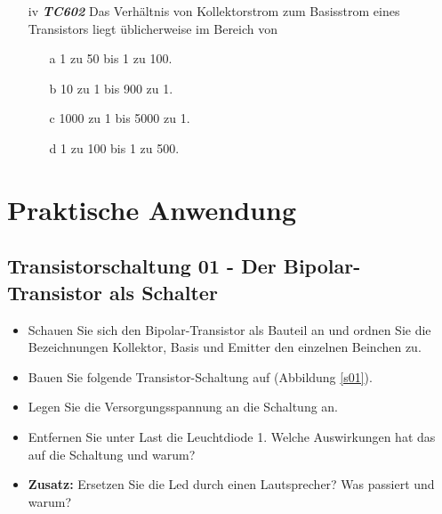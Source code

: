 
\begin{enumerate} 
\item[iv] \emph{\textbf{TC602}}  Das Verhältnis von Kollektorstrom zum Basisstrom eines Transistors liegt üblicherweise im Bereich von
	\begin{enumerate}
	\itemsep1pt\parskip0pt
		\item[a] 1 zu 50 bis 1 zu 100.
		\item[b] 10 zu 1 bis 900 zu 1.
		\item[c] 1000 zu 1 bis 5000 zu 1.
		\item[d] 1 zu 100 bis 1 zu 500.
	\end{enumerate}
\end{enumerate}


\section{Praktische Anwendung}

\subsection[Der Bipolar-Transistor als Schalter]{Transistorschaltung 01 - Der Bipolar-Transistor als Schalter}

\begin{itemize}
\itemsep1pt\parskip0pt
\item Schauen Sie sich den Bipolar-Transistor als Bauteil an und ordnen Sie die Bezeichnungen Kollektor, Basis und Emitter den einzelnen Beinchen zu.
\item Bauen Sie folgende Transistor-Schaltung auf (Abbildung \ref{s01}). 
\item Legen Sie die Versorgungsspannung an die Schaltung an.
\item Entfernen Sie unter Last die Leuchtdiode 1. Welche Auswirkungen hat das auf die Schaltung und warum?
\item \textbf{Zusatz:} Ersetzen Sie die Led durch einen Lautsprecher? Was passiert und warum?
\end{itemize}

